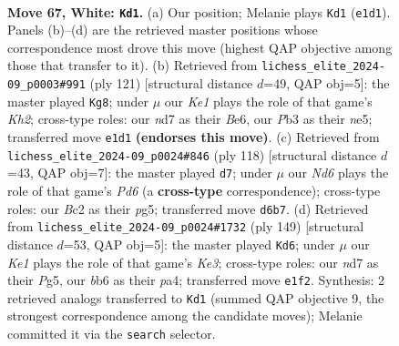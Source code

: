 \documentclass[11pt]{article}
\begin{document}
\clearpage

\begin{figure}[p]\centering
\begin{subfigure}{0.46\textwidth}\centering
\resizebox{\linewidth}{!}{%
\newchessgame
\chessboard[
  setfen={n7/3n2k1/1b1N4/p7/P2pP3/1P5p/2B1P3/4K3 w - - 0 67},
  showmover=false,
  pgfstyle=straightmove, color=movearrow, markmove={e1-d1}
]}
\caption{}
\end{subfigure}\hfill
\begin{subfigure}{0.46\textwidth}\centering
\resizebox{\linewidth}{!}{%
\newchessgame
\chessboard[
  setfen={8/6pk/4b3/4N1Pp/p7/BpP1KP2/8/8 b - - 5 61},
  showmover=false,
  pgfstyle=straightmove, color=movearrow, markmove={h7-g8}
]}
\caption{}
\end{subfigure}
\\[4pt]
\begin{subfigure}{0.46\textwidth}\centering
\resizebox{\linewidth}{!}{%
\newchessgame
\chessboard[
  setfen={2N5/7k/1B1Pnp2/4p1pp/4P3/7P/5PPK/8 w - - 3 60},
  showmover=false,
  pgfstyle=straightmove, color=movearrow, markmove={d6-d7}
]}
\caption{}
\end{subfigure}\hfill
\begin{subfigure}{0.46\textwidth}\centering
\resizebox{\linewidth}{!}{%
\newchessgame
\chessboard[
  setfen={3b4/8/1p2k2N/pP2p1p1/P3P1P1/2K5/8/8 b - - 69 75},
  showmover=false,
  pgfstyle=straightmove, color=movearrow, markmove={e6-d6}
]}
\caption{}
\end{subfigure}
\caption{\textbf{Move 67, White: \texttt{Kd1}.} (a) Our position; Melanie plays \texttt{Kd1} (\texttt{e1d1}). Panels (b)--(d) are the retrieved master positions whose correspondence most drove this move (highest QAP objective among those that transfer to it). (b) Retrieved from \texttt{lichess\_elite\_2024-09\_p0003\#991} (ply 121) [structural distance $d$=49, QAP obj=5]: the master played \texttt{Kg8}; under $\mu$ our \emph{Ke1} plays the role of that game's \emph{Kh2}; cross-type roles: our \emph{n}d7 as their \emph{B}e6, our \emph{P}b3 as their \emph{n}e5; transferred move \texttt{e1d1} \textbf{(endorses this move)}. (c) Retrieved from \texttt{lichess\_elite\_2024-09\_p0024\#846} (ply 118) [structural distance $d$=43, QAP obj=7]: the master played \texttt{d7}; under $\mu$ our \emph{Nd6} plays the role of that game's \emph{Pd6} (a \textbf{cross-type} correspondence); cross-type roles: our \emph{B}c2 as their \emph{p}g5; transferred move \texttt{d6b7}. (d) Retrieved from \texttt{lichess\_elite\_2024-09\_p0024\#1732} (ply 149) [structural distance $d$=53, QAP obj=5]: the master played \texttt{Kd6}; under $\mu$ our \emph{Ke1} plays the role of that game's \emph{Ke3}; cross-type roles: our \emph{n}d7 as their \emph{P}g5, our \emph{b}b6 as their \emph{p}a4; transferred move \texttt{e1f2}. Synthesis: 2 retrieved analogs transferred to \texttt{Kd1} (summed QAP objective 9, the strongest correspondence among the candidate moves); Melanie committed it via the \texttt{search} selector.}
\label{fig:thought-m132}
\end{figure}
\end{document}
